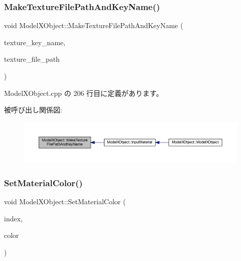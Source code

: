 \subsubsection{\texorpdfstring{Make\+Texture\+File\+Path\+And\+Key\+Name()}{MakeTextureFilePathAndKeyName()}}
{\footnotesize\ttfamily void Model\+X\+Object\+::\+Make\+Texture\+File\+Path\+And\+Key\+Name (\begin{DoxyParamCaption}\item[{std\+::string $\ast$}]{texture\+\_\+key\+\_\+name,  }\item[{std\+::string $\ast$}]{texture\+\_\+file\+\_\+path }\end{DoxyParamCaption})\hspace{0.3cm}{\ttfamily [private]}}



 Model\+X\+Object.\+cpp の 206 行目に定義があります。

被呼び出し関係図\+:\nopagebreak
\begin{figure}[H]
\begin{center}
\leavevmode
\includegraphics[width=350pt]{class_model_x_object_a83995ec817bccb4584d635b2005578a8_icgraph}
\end{center}
\end{figure}
\mbox{\label{class_model_x_object_acc6b5f187b74b421451c8c2c7c2964d7}} 
\subsubsection{\texorpdfstring{Set\+Material\+Color()}{SetMaterialColor()}}
{\footnotesize\ttfamily void Model\+X\+Object\+::\+Set\+Material\+Color (\begin{DoxyParamCaption}\item[{unsigned}]{index,  }\item[{\mbox{\hyperlink{_vector3_d_8h_a680c30c4a07d86fe763c7e01169cd6cc}{X\+Color4}}}]{color }\end{DoxyParamCaption})}



